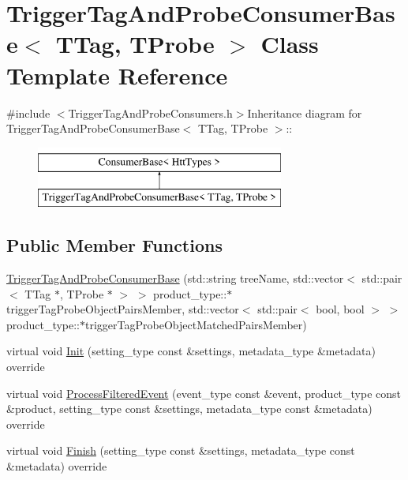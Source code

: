 \hypertarget{classTriggerTagAndProbeConsumerBase}{
\section{TriggerTagAndProbeConsumerBase$<$ TTag, TProbe $>$ Class Template Reference}
\label{classTriggerTagAndProbeConsumerBase}
}


{\ttfamily \#include $<$TriggerTagAndProbeConsumers.h$>$}Inheritance diagram for TriggerTagAndProbeConsumerBase$<$ TTag, TProbe $>$::\begin{figure}[H]
\begin{center}
\leavevmode
\includegraphics[height=2cm]{classTriggerTagAndProbeConsumerBase}
\end{center}
\end{figure}
\subsection*{Public Member Functions}
\begin{DoxyCompactItemize}
\item 
\hyperlink{classTriggerTagAndProbeConsumerBase_aa1e0b20a2b8a635398ce30b094028164}{TriggerTagAndProbeConsumerBase} (std::string treeName, std::vector$<$ std::pair$<$ TTag $\ast$, TProbe $\ast$ $>$ $>$ product\_\-type::$\ast$triggerTagProbeObjectPairsMember, std::vector$<$ std::pair$<$ bool, bool $>$ $>$ product\_\-type::$\ast$triggerTagProbeObjectMatchedPairsMember)
\item 
virtual void \hyperlink{classTriggerTagAndProbeConsumerBase_acec908ee45e6f569a37813374994fc16}{Init} (setting\_\-type const \&settings, metadata\_\-type \&metadata) override
\item 
virtual void \hyperlink{classTriggerTagAndProbeConsumerBase_af30e0162b257606deea2c0614de9de06}{ProcessFilteredEvent} (event\_\-type const \&event, product\_\-type const \&product, setting\_\-type const \&settings, metadata\_\-type const \&metadata) override
\item 
virtual void \hyperlink{classTriggerTagAndProbeConsumerBase_a1d02e67983d6b0373cbbd22d30aeb155}{Finish} (setting\_\-type const \&settings, metadata\_\-type const \&metadata) override
\end{DoxyCompactItemize}
